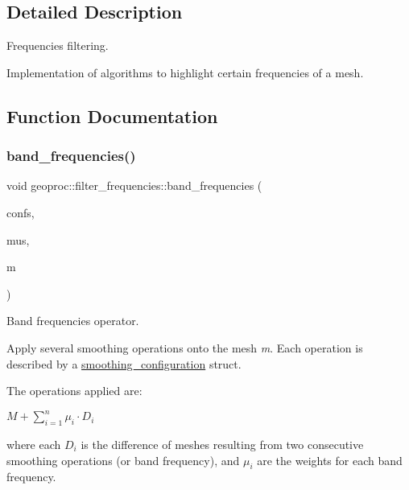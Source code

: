 \subsection{Detailed Description}
Frequencies filtering. 

Implementation of algorithms to highlight certain frequencies of a mesh. 

\subsection{Function Documentation}
\mbox{\label{namespacegeoproc_1_1filter__frequencies_a9a3d38dda8f7703607998e250e264a7c}} 
\subsubsection{\texorpdfstring{band\+\_\+frequencies()}{band\_frequencies()}\hspace{0.1cm}{\footnotesize\ttfamily [1/2]}}
{\footnotesize\ttfamily void geoproc\+::filter\+\_\+frequencies\+::band\+\_\+frequencies (\begin{DoxyParamCaption}\item[{const std\+::vector$<$ \hyperlink{structgeoproc_1_1filter__frequencies_1_1smoothing__configuration}{smoothing\+\_\+configuration} $>$ \&}]{confs,  }\item[{const std\+::vector$<$ double $>$ \&}]{mus,  }\item[{\hyperlink{classgeoproc_1_1TriangleMesh}{Triangle\+Mesh} \&}]{m }\end{DoxyParamCaption})}



Band frequencies operator. 

Apply several smoothing operations onto the mesh {\itshape m}. Each operation is described by a \hyperlink{structgeoproc_1_1filter__frequencies_1_1smoothing__configuration}{smoothing\+\_\+configuration} struct.

The operations applied are\+:

$M + \sum_{i=1}^n \mu_i \cdot D_i$

where each $D_i$ is the difference of meshes resulting from two consecutive smoothing operations (or band frequency), and $\mu_i$ are the weights for each band frequency.

